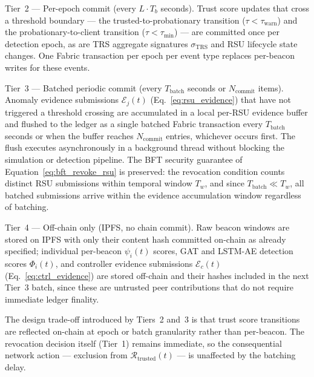 \documentclass[12pt, a4paper]{report}
\begin{document}
Tier~2 --- Per-epoch commit (every $L \cdot T_b$ seconds).
Trust score updates that cross a threshold boundary --- the
trusted-to-probationary transition ($\tau < \tau_{\mathrm{warn}}$)
and the probationary-to-client transition ($\tau < \tau_{\min}$)
--- are committed once per detection epoch, as are TRS aggregate
signatures $\sigma_{\mathrm{TRS}}$ and RSU lifecycle state changes.
One Fabric transaction per epoch per event type replaces per-beacon
writes for these events.

Tier~3 --- Batched periodic commit (every $T_{\mathrm{batch}}$
seconds or $N_{\mathrm{commit}}$ items).
Anomaly evidence submissions $\mathcal{E}_j(t)$
(Eq.~\ref{eq:rsu_evidence}) that have not triggered a threshold
crossing are accumulated in a local per-RSU evidence buffer and
flushed to the ledger as a single batched Fabric transaction every
$T_{\mathrm{batch}}$ seconds or when the buffer reaches
$N_{\mathrm{commit}}$ entries, whichever occurs first.
The flush executes asynchronously in a background thread without
blocking the simulation or detection pipeline.
The BFT security guarantee of Equation~\ref{eq:bft_revoke_rsu}
is preserved: the revocation condition counts distinct RSU
submissions within temporal window $T_w$, and since
$T_{\mathrm{batch}} \ll T_w$, all batched submissions arrive
within the evidence accumulation window regardless of batching.

Tier~4 --- Off-chain only (IPFS, no chain commit).
Raw beacon windows are stored on IPFS with only their content
hash committed on-chain as already specified; individual per-beacon
$\psi_i(t)$ scores, GAT and LSTM-AE detection scores $\Phi_i(t)$,
and controller evidence submissions $\mathcal{E}_c(t)$
(Eq.~\ref{eq:ctrl_evidence}) are stored off-chain and their hashes
included in the next Tier~3 batch, since these are untrusted peer
contributions that do not require immediate ledger finality.

The design trade-off introduced by Tiers~2 and~3 is that trust
score transitions are reflected on-chain at epoch or batch
granularity rather than per-beacon. The revocation decision
itself (Tier~1) remains immediate, so the consequential
network action --- exclusion from $\mathcal{R}_{\mathrm{trusted}}(t)$
--- is unaffected by the batching delay.
\end{document}
